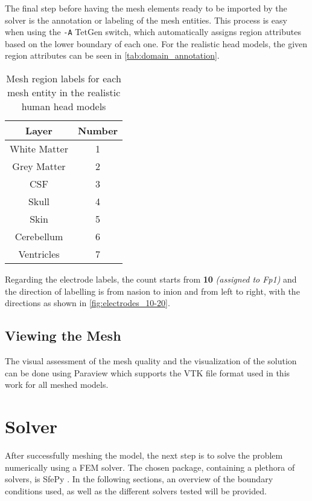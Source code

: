 The final step before having the mesh elements ready to be imported by the solver is the annotation or labeling of the mesh entities. This process is easy when using the \texttt{-A} TetGen \cite{tetgen} switch, which automatically assigns region attributes based on the lower boundary of each one. For the realistic head models, the given region attributes can be seen in \autoref{tab:domain_annotation}.

\begin{table}[!ht]
	\centering
	\caption{Mesh region labels for each mesh entity in the realistic human head models}
	\label{tab:domain_annotation}
	\begin{tabular}{|c|c|}
		\hline
		\rowcolor[HTML]{C0C0C0} 
		{\color[HTML]{000000} \textbf{Layer}} & {\color[HTML]{000000} \textbf{Number}} \\ \hline
		White Matter & 1 \\ \hline
		Grey Matter & 2 \\ \hline
		\gls{CSF} & 3 \\ \hline
		Skull & 4 \\ \hline
		Skin & 5 \\ \hline
		Cerebellum & 6 \\ \hline
		Ventricles & 7 \\ \hline
	\end{tabular}
\end{table}

Regarding the electrode labels, the count starts from \textbf{10} \textit{(assigned to Fp1)} and the direction of labelling is from \gls{nasion} to \gls{inion} and from left to right, with the directions as shown in \autoref{fig:electrodes_10-20}.

\subsection{Viewing the Mesh}

The visual assessment of the mesh quality and the visualization of the solution can be done using Paraview \cite{paraview} which supports the \gls{VTK} file format used in this work for all meshed models.

\section{Solver}
\label{sec:fem_solver}

After successfully meshing the model, the next step is to solve the problem numerically using a \gls{FEM} solver. The chosen package, containing a plethora of solvers, is SfePy \cite{Cimrman2019}. In the following sections, an overview of the boundary conditions used, as well as the different solvers tested will be provided.

